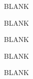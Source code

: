 \documentclass[a4]{beamer}
\begin{document}
\begin{frame}
	BLANK
\end{frame}
\begin{frame}
	BLANK
\end{frame}
\begin{frame}
	BLANK
\end{frame}
\begin{frame}
	BLANK
\end{frame}
\begin{frame}
	BLANK
\end{frame}


\end{document}
